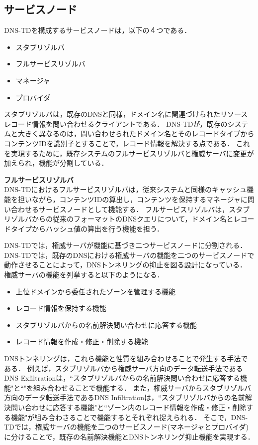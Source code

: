 \subsection{サービスノード}
DNS-TDを構成するサービスノードは，以下の４つである．
\begin{itemize}
 \item スタブリゾルバ
 \item フルサービスリゾルバ
 \item マネージャ
 \item プロバイダ
\end{itemize}

スタブリゾルバは，既存のDNSと同様，ドメイン名に関連づけられたリソースレコード情報を問い合わせるクライアントである．
DNS-TDが，既存のシステムと大きく異なるのは，問い合わせられたドメイン名とそのレコードタイプからコンテンツIDを識別子とすることで，レコード情報を解決する点である．
これを実現するために，既存システムのフルサービスリゾルバと権威サーバに変更が加えられ，機能が分割している．

\textbf{フルサービスリゾルバ}\\
DNS-TDにおけるフルサービスリゾルバは，従来システムと同様のキャッシュ機能を担いながら，コンテンツIDの算出し，コンテンツを保持するマネージャに問い合わせるサービスノードとして機能する．
フルサービスリゾルバは，スタブリゾルバからの従来のフォーマットのDNSクエリについて，ドメイン名とレコードタイプからハッシュ値の算出を行う機能を担う．


DNS-TDでは，権威サーバが機能に基づき二つサービスノードに分割される．
DNS-TDでは，既存のDNSにおける権威サーバの機能を二つのサービスノードで動作させることによって，DNSトンネリングの抑止を図る設計になっている．
権威サーバの機能を列挙すると以下のようになる．
\begin{itemize}
 \item 上位ドメインから委任されたゾーンを管理する機能
 \item レコード情報を保持する機能
 \item スタブリゾルバからの名前解決問い合わせに応答する機能
 \item レコード情報を作成・修正・削除する機能
\end{itemize}
DNSトンネリングは，これら機能と性質を組み合わせることで発生する手法である．
例えば，スタブリゾルバから権威サーバ方向のデータ転送手法であるDNS Exfiltrationは，``スタブリゾルバからの名前解決問い合わせに応答する機能"と``"を組み合わせることで機能する．
また，権威サーバからスタブリゾルバ方向のデータ転送手法であるDNS Infiltrationは，``スタブリゾルバからの名前解決問い合わせに応答する機能"と``ゾーン内のレコード情報を作成・修正・削除する機能"が組み合わさることで機能するとそれぞれ捉えられる．
そこで，DNS-TDでは，権威サーバの機能を二つのサービスノード(マネージャとプロバイダ)に分けることで，既存の名前解決機能とDNSトンネリング抑止機能を実現する．

